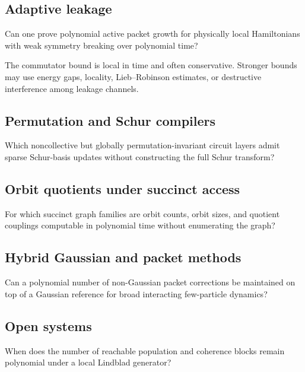 \subsection{Adaptive leakage}
\begin{question}
Can one prove polynomial active packet growth for physically local Hamiltonians with weak symmetry breaking over polynomial time?
\end{question}
The commutator bound is local in time and often conservative. Stronger bounds may use energy gaps, locality, Lieb--Robinson estimates, or destructive interference among leakage channels.

\subsection{Permutation and Schur compilers}
\begin{question}
Which noncollective but globally permutation-invariant circuit layers admit sparse Schur-basis updates without constructing the full Schur transform?
\end{question}

\subsection{Orbit quotients under succinct access}
\begin{question}
For which succinct graph families are orbit counts, orbit sizes, and quotient couplings computable in polynomial time without enumerating the graph?
\end{question}

\subsection{Hybrid Gaussian and packet methods}
\begin{question}
Can a polynomial number of non-Gaussian packet corrections be maintained on top of a Gaussian reference for broad interacting few-particle dynamics?
\end{question}

\subsection{Open systems}
\begin{question}
When does the number of reachable population and coherence blocks remain polynomial under a local Lindblad generator?
\end{question}

